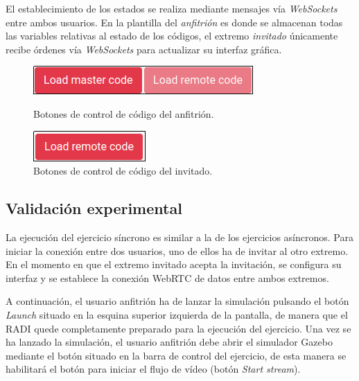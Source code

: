 \documentclass[a4paper, 12pt]{book}
\begin{document}
El establecimiento de los estados se realiza mediante mensajes vía \emph{WebSockets} entre ambos usuarios. En la plantilla del \emph{anfitrión} es donde se almacenan todas las variables relativas al estado de los códigos, el extremo \emph{invitado} únicamente recibe órdenes vía \emph{WebSockets} para actualizar su interfaz gráfica.

\begin{figure}[H]
  \centering
  \begin{minipage}[b]{0.3\textwidth}
  	\centering
    \includegraphics[width=\textwidth]{img/host_code_buttons.png}
    \caption{Botones de control de código del anfitrión.}
    \label{figura:robot_davinci}
  \end{minipage}
  \hfill
  \begin{minipage}[b]{0.3\textwidth}
  	\centering
    \includegraphics[width=\textwidth]{img/guest_code_buttons.png}
    \caption{Botones de control de código del invitado.}
    \label{figura:robot_atrias}
  \end{minipage}
\end{figure}


\subsection{Validación experimental}
La ejecución del ejercicio síncrono es similar a la de los ejercicios asíncronos. Para iniciar la conexión entre dos usuarios, uno de ellos ha de invitar al otro extremo. En el momento en que el extremo invitado acepta la invitación, se configura su interfaz y se establece la conexión WebRTC de datos entre ambos extremos. 

A continuación, el usuario anfitrión ha de lanzar la simulación pulsando el botón \emph{Launch} situado en la esquina superior izquierda de la pantalla, de manera que el RADI quede completamente preparado para la ejecución del ejercicio. Una vez se ha lanzado la simulación, el usuario anfitrión debe abrir el simulador Gazebo mediante el botón situado en la barra de control del ejercicio, de esta manera se habilitará el botón para iniciar el flujo de vídeo (botón \emph{Start stream}). 
\end{document}
